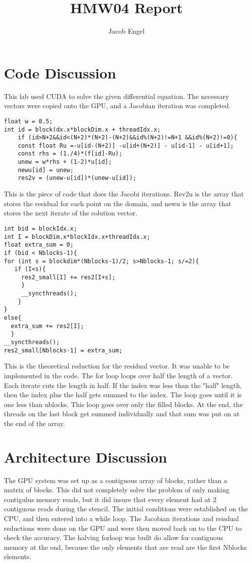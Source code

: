\documentclass[11pt]{article}
\begin{document}
\title{HMW04 Report}
\author{Jacob Engel}
\maketitle


\section{Code Discussion}
This lab used CUDA to solve the given differential equation. The necessary vectors were copied onto the GPU, and a Jacobian iteration was completed. 
\begin{lstlisting}
float w = 0.5;
int id = block(dx.x*blockDim.x + threadIdx.x;
	if (id>N+2&&id<(N+2)*(N+2)-(N+2)&&id%(N+2)!=N+1 &&id%(N+2)!=0){
	const float Ru =-u[id-(N+2)] -u[id+(N+2)] - u[id-1] - u[id+1];
	const rhs = (1./4)*(f[id]-Ru);
	unew = w*rhs + (1-2)*u[id];
	newu[id] = unew;
	res2v = (unew-u[id])*(unew-u[id]);
\end{lstlisting}
This is the piece of code that does the Jacobi iterations. Rev2u is the array that stores the residual for each point on the domain, and newu is the array that stores the next iterate of the solution vector. 

\begin{lstlisting}
int bid = blockIdx.x;
int I = blockDim.x*blockIdx.x+threadIdx.x;
float extra_sum = 0;
if (bid < Nblocks-1){
for (int s = blockdim*(Nblocks-1)/2; s>Nblocks-1; s/=2){
   if (I<s){
     res2_small[I] += res2[I+s];
     }
     __syncthreads();
    }
}
else{
  extra_sum += res2[I];
  }
__syncthreads();
res2_small[Nblocks-1] = extra_sum;

\end{lstlisting}
This is the theoretical reduction for the residual vector. It was unable to be implemented in the code. The for loop loops over half the length of a vector. Each iterate cuts the length in half. If the index was less than the "half" length, then the index plus the half gets summed to the index. The loop goes until it is one less than nblocks. This loop goes over only the filled blocks. At the end, the threads on the last block get summed individually and that sum was put on at the end of the array. 


\section{Architecture Discussion}
	The GPU system was set up as a contiguous array of blocks, rather than a matrix of blocks. This did not completely solve the problem of only making contigulus memory reads, but it did insure that every element had at 2 contiguous reads during the stencil. The initial conditions were established on the CPU, and then entered into a while loop. The Jacobian iterations and reisdual reductions were done on the GPU and were then moved back on to the CPU to check the accuracy. 
The halving forloop was built do allow for contiguous memory at the end, because the only elements that are read are the first Nblocks elements.
\end{document}
